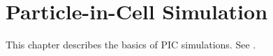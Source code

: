 
\chapter{Particle-in-Cell Simulation}

This chapter describes the basics of PIC simulations. See
\citep{yee_numerical_1966}.